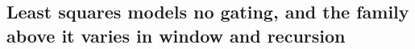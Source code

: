 
\subsection*{Least squares models no gating, and the family above it varies in window and recursion}


